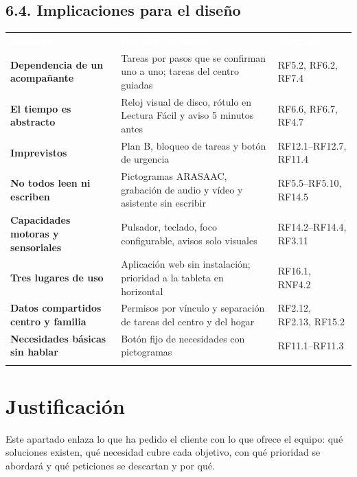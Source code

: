\documentclass[11pt,a4paper]{article}
\newcommand{\hl}[1]{\textcolor{gblue}{\textbf{#1}}}
\begin{document}
\subsection*{6.4. Implicaciones para el diseño}
{\small\par\noindent\begin{tabular}{@{}>{\raggedright\arraybackslash}p{}>{\raggedright\arraybackslash}p{}>{\raggedright\arraybackslash}p{}@{}}
\rowcolor{gblue}\textcolor{white}{\textbf{Hallazgo}} & \textcolor{white}{\textbf{Decisión de diseño}} & \textcolor{white}{\textbf{Requisitos}} \\
\hl{Dependencia de un acompañante} & Tareas por pasos que se confirman uno a uno; tareas del centro guiadas & RF5.2, RF6.2, RF7.4 \\ \arrayrulecolor{gline}\hline
\rowcolor{glight}
\hl{El tiempo es abstracto} & Reloj visual de disco, rótulo en Lectura Fácil y aviso 5 minutos antes & RF6.6, RF6.7, RF4.7 \\ \arrayrulecolor{gline}\hline
\hl{Imprevistos} & Plan B, bloqueo de tareas y botón de urgencia & RF12.1--RF12.7, RF11.4 \\ \arrayrulecolor{gline}\hline
\rowcolor{glight}
\hl{No todos leen ni escriben} & Pictogramas ARASAAC, grabación de audio y vídeo y asistente sin escribir & RF5.5--RF5.10, RF14.5 \\ \arrayrulecolor{gline}\hline
\hl{Capacidades motoras y sensoriales} & Pulsador, teclado, foco configurable, avisos solo visuales & RF14.2--RF14.4, RF3.11 \\ \arrayrulecolor{gline}\hline
\rowcolor{glight}
\hl{Tres lugares de uso} & Aplicación web sin instalación; prioridad a la tableta en horizontal & RF16.1, RNF4.2 \\ \arrayrulecolor{gline}\hline
\hl{Datos compartidos centro y familia} & Permisos por vínculo y separación de tareas del centro y del hogar & RF2.12, RF2.13, RF15.2 \\ \arrayrulecolor{gline}\hline
\rowcolor{glight}
\hl{Necesidades básicas sin hablar} & Botón fijo de necesidades con pictogramas & RF11.1--RF11.3 \\ \arrayrulecolor{gline}\hline
\end{tabular}\par}\medskip
{}
\section{Justificación}
Este apartado enlaza lo que ha pedido el cliente con lo que ofrece el equipo: qué soluciones existen, qué necesidad cubre cada objetivo, con qué prioridad se abordará y qué peticiones se descartan y por qué.
\end{document}
